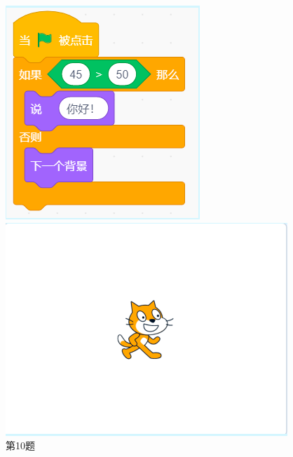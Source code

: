 \documentclass[10pt, a4paper]{article}
\begin{document}
\begin{enumerate}
        \begin{figure}[htbp]
            \centering
            \begin{minipage}[t]{.16\textwidth}
                \centering
                \includegraphics[width=\textwidth]{10.png}
                \caption*{第10题}
            \end{minipage}
            \begin{minipage}[t]{.22\textwidth}
                \centering
                \includegraphics[width=\textwidth]{11.png}

\end{minipage}
\end{figure}
\end{enumerate}
\end{document}
